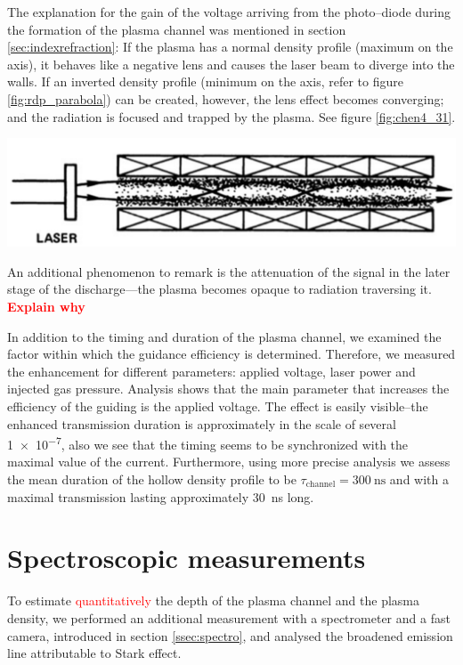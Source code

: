 \documentclass[justified,nofonts,nobib,openany]{tufte-book}
\begin{document}
The explanation for the gain of the voltage arriving from the photo--diode during the formation of the plasma channel was mentioned in section \ref{sec:indexrefraction}: If the plasma has a normal density profile (maximum on the axis), it behaves like a negative lens and causes the laser beam to diverge into the walls. If an inverted density profile (minimum on the axis, refer to figure \ref{fig:rdp_parabola}) can be created, however, the lens effect becomes converging; and the radiation is focused and trapped by the plasma. See figure \ref{fig:chen4_31}.
\begin{marginfigure}
\includegraphics[width=\marginparwidth]{./figures/chen4_31.PNG}
\caption{A plasma confined inside the capillary will trap the \SI{800}{\nm} laser light only if the plasma has a density minimum on axis.}
\label{fig:chen4_31}
\end{marginfigure}

An additional phenomenon to remark is the attenuation of the signal in the later stage of the discharge---the plasma becomes opaque to radiation traversing it. \textcolor{red}{\textbf{Explain why}}

In addition to the timing and duration of the plasma channel, we examined the factor within which the guidance efficiency is determined. Therefore, we measured the enhancement for different parameters: applied voltage, laser power and injected gas pressure. Analysis shows that the main parameter that increases the efficiency of the guiding is the applied voltage. The effect is easily visible--the enhanced transmission duration is approximately in the scale of several \SI{1e-7}{\sec}, also we see that the timing seems to be synchronized with the maximal value of the current. Furthermore, using more precise analysis we assess the mean duration of the hollow density profile to be $\tau_\text{channel}=\SI{300}{\ns}$ and with a maximal transmission lasting approximately \SI{30}{\ns} long.

\section{Spectroscopic measurements}\label{sec:spectro}
To estimate \textcolor{red}{quantitatively} the depth of the plasma channel and the plasma density, we performed an additional measurement with a spectrometer and a fast camera, introduced in section \ref{ssec:spectro}, and analysed the broadened emission line attributable to Stark effect.
\end{document}

